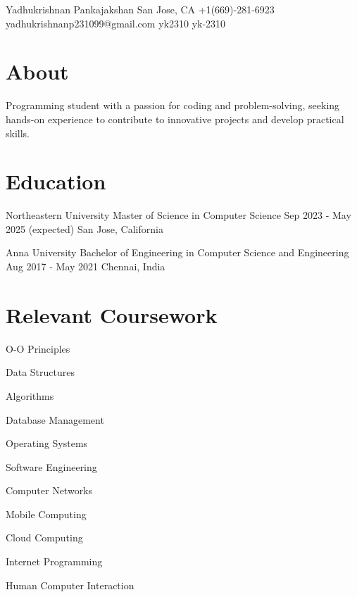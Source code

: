 \documentclass[letterpaper]{resume_config}
\begin{document}
\Header
    {Yadhukrishnan Pankajakshan} %
    {San Jose, CA} %
    {+1(669)-281-6923} %
    {yadhukrishnanp231099@gmail.com} %
    {yk2310} %
    {yk-2310}

\section{About}
{
    Programming student with a passion for coding and problem-solving, seeking hands-on experience to contribute to innovative projects and develop practical skills.
}

\section{Education}

\EducationExperience
    {Northeastern University} %
    {Master of Science in Computer Science} %
    {Sep 2023 - May 2025 \footnotesize{(expected)}} %
    {San Jose, California} %

\EducationExperience
    {Anna University} %
    {Bachelor of Engineering in Computer Science and Engineering} %
    {Aug 2017 - May 2021} %
    {Chennai, India} %
\vspace{-5pt}


\section{Relevant Coursework}
\begin{SkillsList}{
    \item{O-O Principles}
    \item{Data Structures}
    \item{Algorithms}
    \item{Database Management}
    \item{Operating Systems}
    \item{Software Engineering}
    \item{Computer Networks}
    \item{Mobile Computing}
    \item{Cloud Computing}
    \item{Internet Programming}
    \item{Human Computer Interaction}
}
\end{SkillsList}
\end{document}
